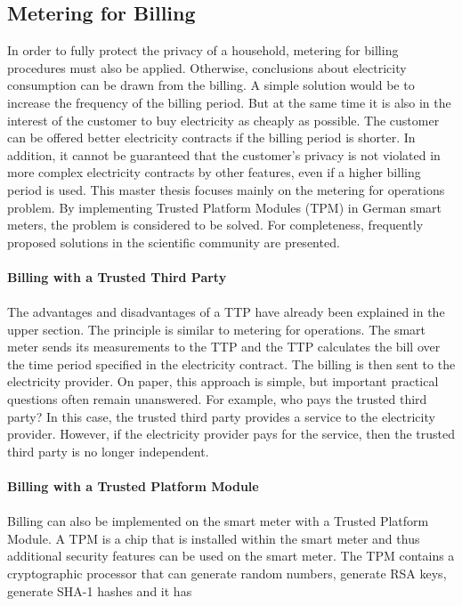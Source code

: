 \subsection{Metering for Billing}
In order to fully protect the privacy of a household, metering for billing procedures must also be applied. Otherwise, conclusions about electricity consumption can be drawn from the billing. A simple solution would be to increase the frequency of the billing period. But at the same time it is also in the interest of the customer to buy electricity as cheaply as possible. The customer can be offered better electricity contracts if the billing period is shorter. In addition, it cannot be guaranteed that the customer's privacy is not violated in more complex electricity contracts by other features, even if a higher billing period is used. %
This master thesis focuses mainly on the metering for operations problem. 
By implementing Trusted Platform Modules (TPM) in German smart meters, the problem is considered to be solved. For completeness, frequently proposed solutions in the scientific community are presented.\\
\\
\textbf{Billing with a Trusted Third Party}
\\
\\
The advantages and disadvantages of a TTP have already been explained in the upper section. The principle is similar to metering for operations. The smart meter sends its measurements to the TTP and the TTP calculates the bill over the time period specified in the electricity contract. The billing is then sent to the electricity provider. On paper, this approach is simple, but important practical questions often remain unanswered. For example, who pays the trusted third party? In this case, the trusted third party provides a service to the electricity provider. However, if the electricity provider pays for the service, then the trusted third party is no longer independent.\\
\\
\textbf{Billing with a Trusted Platform Module}
\\
\\
Billing can also be implemented on the smart meter with a Trusted Platform Module. A TPM is a chip that is installed within the smart meter and thus additional security features can be used on the smart meter. The TPM contains a cryptographic processor that can generate random numbers, generate RSA keys, generate SHA-1 hashes and it has
